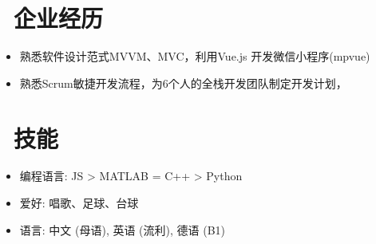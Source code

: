\documentclass{resume}
\begin{document}


\section{\faUsers\ 企业经历}

\begin{itemize}
	\item 熟悉软件设计范式MVVM、MVC，利用Vue.js 开发微信小程序(mpvue)
	\item 熟悉Scrum敏捷开发流程，为6个人的全栈开发团队制定开发计划，

\end{itemize}

\section{\faCogs\ 技能}
\begin{itemize}[parsep=0.5ex]
  \item 编程语言: JS > MATLAB = C++ > Python
  \item 爱好: 唱歌、足球、台球
  \item 语言: 中文 (母语), 英语 (流利), 德语 (B1)
\end{itemize}



%
%
\end{document}
